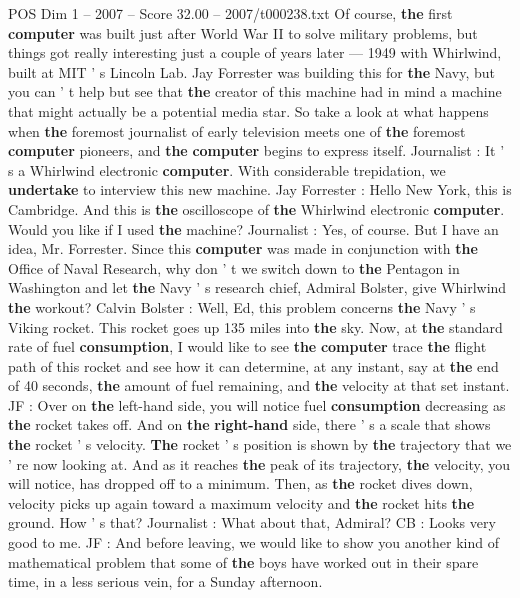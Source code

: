 \begin{textsample}{POS Dim 1 – 2007 – Score 32.00 – 2007/t000238.txt}
Of course, \textbf{the} first \textbf{computer} was built just after World War II to solve military problems, but things got really interesting just a couple of years later — 1949 with Whirlwind, built at MIT ' s Lincoln Lab.
Jay Forrester was building this for \textbf{the} Navy, but you can ' t help but see that \textbf{the} creator of this machine had in mind a machine that might actually be a potential media star.
So take a look at what happens when \textbf{the} foremost journalist of early television meets one of \textbf{the} foremost \textbf{computer} pioneers, and \textbf{the} \textbf{computer} begins to express itself.
Journalist : It ' s a Whirlwind electronic \textbf{computer}.
With considerable trepidation, we \textbf{undertake} to interview this new machine.
Jay Forrester : Hello New York, this is Cambridge.
And this is \textbf{the} oscilloscope of \textbf{the} Whirlwind electronic \textbf{computer}.
Would you like if I used \textbf{the} machine?
Journalist : Yes, of course.
But I have an idea, Mr.
Forrester.
Since this \textbf{computer} was made in conjunction with \textbf{the} Office of Naval Research, why don ' t we switch down to \textbf{the} Pentagon in Washington and let \textbf{the} Navy ' s research chief, Admiral Bolster, give Whirlwind \textbf{the} workout?
Calvin Bolster : Well, Ed, this problem concerns \textbf{the} Navy ' s Viking rocket.
This rocket goes up 135 miles into \textbf{the} sky.
Now, at \textbf{the} standard rate of fuel \textbf{consumption}, I would like to see \textbf{the} \textbf{computer} trace \textbf{the} flight path of this rocket and see how it can determine, at any instant, say at \textbf{the} end of 40 seconds, \textbf{the} amount of fuel remaining, and \textbf{the} velocity at that set instant.
JF : Over on \textbf{the} left-hand side, you will notice fuel \textbf{consumption} decreasing as \textbf{the} rocket takes off.
And on \textbf{the} \textbf{right-hand} side, there ' s a scale that shows \textbf{the} rocket ' s velocity. \textbf{The} rocket ' s position is shown by \textbf{the} trajectory that we ' re now looking at.
And as it reaches \textbf{the} peak of its trajectory, \textbf{the} velocity, you will notice, has dropped off to a minimum.
Then, as \textbf{the} rocket dives down, velocity picks up again toward a maximum velocity and \textbf{the} rocket hits \textbf{the} ground.
How ' s that?
Journalist : What about that, Admiral?
CB : Looks very good to me.
JF : And before leaving, we would like to show you another kind of mathematical problem that some of \textbf{the} boys have worked out in their spare time, in a less serious vein, for a Sunday afternoon.

\end{textsample}
